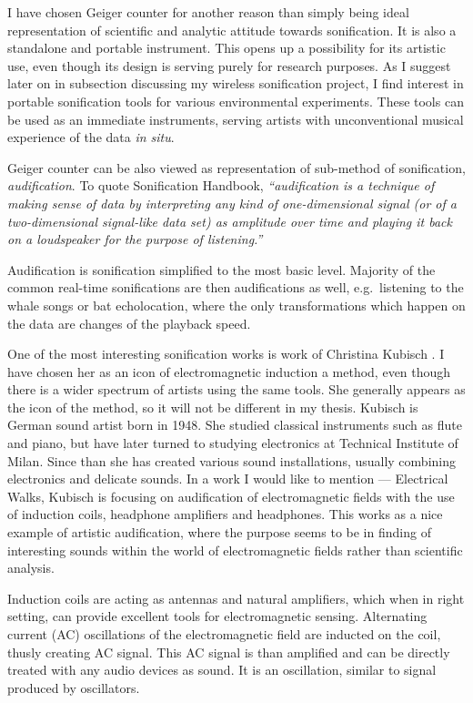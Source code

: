 \documentclass[12pt,a4paper,oneside]{report}
\begin{document}
I have chosen Geiger counter for another reason than simply being ideal representation of scientific and analytic attitude towards sonification. It is also a standalone and portable instrument. This opens up a possibility for its artistic use, even though its design is serving purely for research purposes. As I suggest later on in subsection discussing my wireless sonification project, I find interest in portable sonification tools for various environmental experiments. These tools can be used as an immediate instruments, serving artists with unconventional musical experience of the data \emph{in situ}.  

Geiger counter can be also viewed as representation of sub-method of sonification, \emph{audification}. To quote Sonification Handbook,  \emph{``audification is a technique of making sense of data by interpreting any kind of one-dimensional signal (or of a two-dimensional signal-like data set) as amplitude over time and playing it back on a loudspeaker for the purpose of listening.''} \cite[p.~301]{audif}

Audification is sonification simplified to the most basic level. Majority of the common real-time sonifications are then audifications as well, e.g.\ listening to the whale songs or bat echolocation, where the only transformations which happen on the data are changes of the playback speed.

One of the most interesting sonification works is work of Christina Kubisch \cite{ChKubisch2012}. I have chosen her as an icon of electromagnetic induction a method, even though there is a wider spectrum of artists using the same tools. She generally appears as the icon of the method, so it will not be different in my thesis. Kubisch is German sound artist born in 1948. She studied classical instruments such as flute and piano, but have later turned to studying electronics at Technical Institute of Milan. Since than she has created various sound installations, usually combining electronics and delicate sounds. In a work I would like to mention --- Electrical Walks, Kubisch is focusing on audification of electromagnetic fields with the use of induction coils, headphone amplifiers and headphones. This works as a nice example of artistic audification, where the purpose seems to be in finding of interesting sounds within the world of electromagnetic fields rather than scientific analysis. 

Induction coils are acting as antennas and natural amplifiers, which when in right setting, can provide excellent tools for electromagnetic sensing. Alternating current (AC) oscillations of the electromagnetic field are inducted on the coil, thusly creating AC signal. This AC signal is than amplified and can be directly treated with any audio devices as sound. It is an oscillation, similar to signal produced by oscillators.
\end{document}
